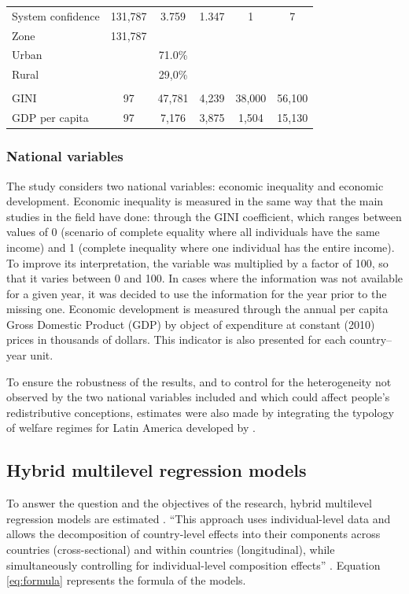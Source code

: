\documentclass[utf8]{frontiersSCNS} %
\begin{document}
\begin{table}
\begin{tabular}{lccccc}
System confidence & 131,787 & 3.759 & 1.347 & 1 & 7 \\
Zone & 131,787 &  &  &  &  \\
\hspace{3mm}Urban & & 71.0\% & & & \\
\hspace{3mm}Rural & & 29,0\% & & & \\
\hline \\[-1.8ex]
GINI & 97 & 47,781 & 4,239 & 38,000 & 56,100 \\
GDP  per capita & 97 & 7,176 & 3,875 & 1,504 & 15,130 \\
\bottomrule
\end{tabular}
\end{table}

\subsubsection{National variables}

The study considers two national variables: economic inequality and economic development. Economic inequality is measured in the same way that the main studies in the field have done: through the GINI coefficient, which ranges between values of 0 (scenario of complete equality where all individuals have the same income) and 1 (complete inequality where one individual has the entire income). To improve its interpretation, the variable was multiplied by a factor of 100, so that it varies between 0 and 100. In cases where the information was not available for a given year, it was decided to use the information for the year prior to the missing one. Economic development is measured through the annual per capita Gross Domestic Product (GDP) by object of expenditure at constant (2010) prices in thousands of dollars. This indicator is also presented for each country–year unit.

To ensure the robustness of the results, and to control for the heterogeneity not observed by the two national variables included and which could affect people’s redistributive conceptions, estimates were also made by integrating the typology of welfare regimes for Latin America developed by \textcite{MartinezFranzoniWelfareRegimesLatin2008}.

\subsection{Hybrid multilevel regression models}

To answer the question and the objectives of the research, hybrid multilevel regression models are estimated \parencite{FairbrotherTwoMultilevelModeling2014}. “This approach uses individual-level data and allows the decomposition of country-level effects into their components across countries (cross-sectional) and within countries (longitudinal),  while simultaneously controlling for individual-level composition effects” \parencite[p.~3]{Schmidt-CatranEconomicinequalitypublic2016}. Equation \ref{eq:formula} represents the formula of the models.
\end{document}

